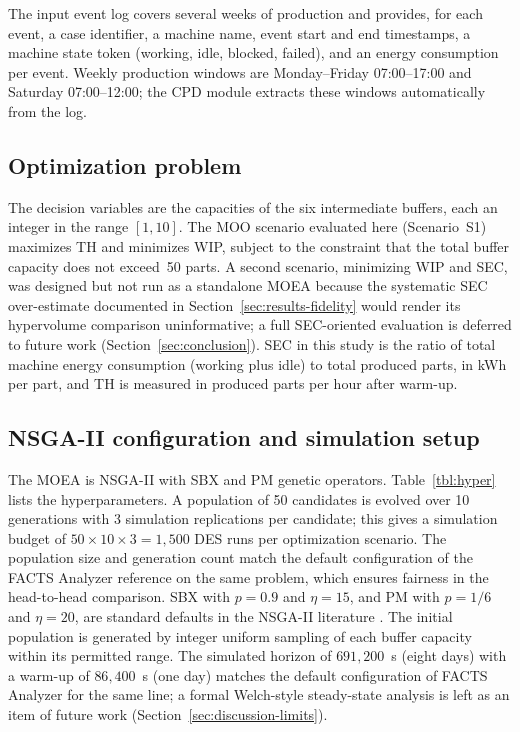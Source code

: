 \documentclass[a4paper,fleqn]{cas-sc}
\begin{document}
  The input event log covers several weeks of production and provides, for each event, a case identifier, a machine     
  name, event start and end timestamps, a machine state token (working, idle, blocked, failed), and an energy
  consumption per event. Weekly production windows are Monday--Friday 07:00--17:00 and Saturday 07:00--12:00; the CPD   
  module extracts these windows automatically from the log. 

  \subsection{Optimization problem}\label{sec:case-problem}                                                             
   
The decision variables are the capacities of the six intermediate buffers, each an integer in the range $[1, 10]$. The MOO scenario evaluated here (Scenario~S1) maximizes TH and minimizes WIP, subject to the constraint that the  
  total buffer capacity does not exceed~50 parts. A second scenario, minimizing WIP and SEC, was designed but not   
  run as a standalone MOEA because the systematic SEC over-estimate documented in Section~\ref{sec:results-fidelity}
  would render its hypervolume comparison uninformative; a full SEC-oriented evaluation is deferred to future work  
  (Section~\ref{sec:conclusion}). 
  SEC in    
  this study is the ratio of total machine energy consumption (working plus idle) to total produced parts, in kWh per
  part, and TH is measured in produced parts per hour after warm-up.

  \subsection{NSGA-II configuration and simulation setup}\label{sec:case-facts}                                         
   
  The MOEA is NSGA-II with SBX and PM genetic operators. Table~\ref{tbl:hyper} lists   
  the hyperparameters. A population of 50 candidates is evolved over 10 generations with 3 simulation replications per
  candidate; this gives a simulation budget of $50 \times 10 \times 3 = 1{,}500$ DES runs per optimization scenario. The
   population size and generation count match the default configuration of the FACTS Analyzer reference on the same
  problem, which ensures fairness in the head-to-head comparison. SBX with $p = 0.9$ and $\eta = 15$, and PM with $p =
  1/6$ and $\eta = 20$, are standard defaults in the NSGA-II literature \citep{Deb2002nsga2}. The initial population is
  generated by integer uniform sampling of each buffer capacity within its permitted range. The simulated horizon of
  $691{,}200$~s (eight days) with a warm-up of $86{,}400$~s (one day) matches the default configuration of FACTS
  Analyzer for the same line; a formal Welch-style steady-state analysis is left as an item of future work
  (Section~\ref{sec:discussion-limits}).
\end{document}
